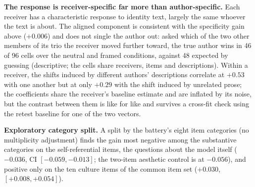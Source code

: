 \documentclass[11pt]{article}
\begin{document}
\textbf{The response is receiver-specific far more than author-specific.} Each
receiver has a characteristic response to identity text, largely the same
whoever the text is about. The aligned component is consistent with the
specificity gain above ($+0.006$) and does not single the author out: asked
which of the two other members of its trio the receiver moved further
toward, the true author wins in 46 of 96 cells over the neutral and framed
conditions, against 48 expected by guessing (descriptive; the cells share
receivers, items and descriptions). Within a receiver, the shifts induced by
different authors' descriptions correlate at $+0.53$ with one another but at
only $+0.29$ with the shift induced by unrelated prose; the coefficients
share the receiver's baseline estimate and are inflated by its noise, but
the contrast between them is like for like and survives a cross-fit check
using the retest baseline for one of the two vectors.

\textbf{Exploratory category split.} A split by the battery's eight
item categories (no multiplicity adjustment) finds the gain most negative
among the substantive categories on the self-referential items, the
questions about the model itself ($-0.036$, CI $[-0.059, -0.013]$; the
two-item aesthetic control is at $-0.056$), and positive only on the ten
culture items of the
common item set
($+0.030$, $[+0.008, +0.054]$).
\end{document}
